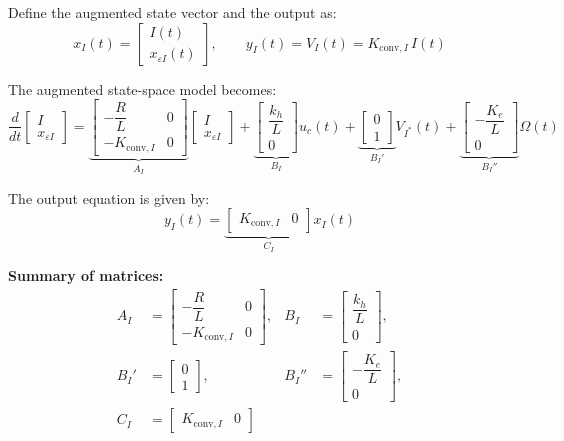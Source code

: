 \documentclass{rapportCS}
\begin{document}
Define the augmented state vector and the output as:
\begin{equation*}
x_I(t) =
\begin{bmatrix}
I(t) \\[4pt]
x_{\varepsilon I}(t)
\end{bmatrix},
\qquad
y_I(t) = V_I(t) = K_{\mathrm{conv},I}\,I(t)
\end{equation*}

The augmented state-space model becomes:
\begin{equation*}
\frac{d}{dt}
\begin{bmatrix}
I \\[4pt]
x_{\varepsilon I}
\end{bmatrix}
=
\underbrace{
\begin{bmatrix}
-\dfrac{R}{L} & 0 \\[6pt]
- K_{\mathrm{conv},I} & 0
\end{bmatrix}}_{A_I}
\begin{bmatrix}
I \\[4pt]
x_{\varepsilon I}
\end{bmatrix}
+
\underbrace{
\begin{bmatrix}
\dfrac{k_h}{L} \\[4pt]
0
\end{bmatrix}}_{B_I}
u_c(t)
+
\underbrace{
\begin{bmatrix}
0 \\[4pt]
1
\end{bmatrix}}_{B_I'}
V_{I^*}(t)
+
\underbrace{
\begin{bmatrix}
-\dfrac{K_e}{L} \\[4pt]
0
\end{bmatrix}}_{B_I''}
\Omega(t)
\end{equation*}

The output equation is given by:
\begin{equation*}
y_I(t) =
\underbrace{\begin{bmatrix}
K_{\mathrm{conv},I} & 0
\end{bmatrix}}_{C_I}
x_I(t)
\end{equation*}

\noindent\textbf{Summary of matrices:}
\begin{align*}
A_I &=
\begin{bmatrix}
-\dfrac{R}{L} & 0 \\[4pt]
- K_{\mathrm{conv},I} & 0
\end{bmatrix},
&
B_I &=
\begin{bmatrix}
\dfrac{k_h}{L} \\[4pt]
0
\end{bmatrix},\\[6pt]
B_I' &=
\begin{bmatrix}
0 \\[4pt]
1
\end{bmatrix},
&
B_I'' &=
\begin{bmatrix}
-\dfrac{K_e}{L} \\[4pt]
0
\end{bmatrix},\\[6pt]
C_I &=
\begin{bmatrix}
K_{\mathrm{conv},I} & 0
\end{bmatrix}
\end{align*}
\end{document}
